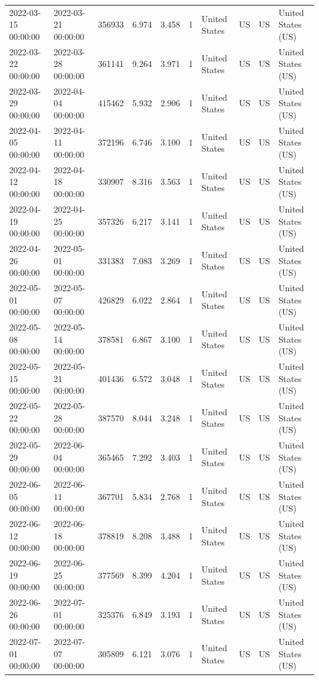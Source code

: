 \begin{tabular}{llrrrlllll}
2022-03-15 00:00:00 & 2022-03-21 00:00:00 & 356933 & 6.974 & 3.458 & 1 & United States & US & US & United States (US) \\
2022-03-22 00:00:00 & 2022-03-28 00:00:00 & 361141 & 9.264 & 3.971 & 1 & United States & US & US & United States (US) \\
2022-03-29 00:00:00 & 2022-04-04 00:00:00 & 415462 & 5.932 & 2.906 & 1 & United States & US & US & United States (US) \\
2022-04-05 00:00:00 & 2022-04-11 00:00:00 & 372196 & 6.746 & 3.100 & 1 & United States & US & US & United States (US) \\
2022-04-12 00:00:00 & 2022-04-18 00:00:00 & 330907 & 8.316 & 3.563 & 1 & United States & US & US & United States (US) \\
2022-04-19 00:00:00 & 2022-04-25 00:00:00 & 357326 & 6.217 & 3.141 & 1 & United States & US & US & United States (US) \\
2022-04-26 00:00:00 & 2022-05-01 00:00:00 & 331383 & 7.083 & 3.269 & 1 & United States & US & US & United States (US) \\
2022-05-01 00:00:00 & 2022-05-07 00:00:00 & 426829 & 6.022 & 2.864 & 1 & United States & US & US & United States (US) \\
2022-05-08 00:00:00 & 2022-05-14 00:00:00 & 378581 & 6.867 & 3.100 & 1 & United States & US & US & United States (US) \\
2022-05-15 00:00:00 & 2022-05-21 00:00:00 & 401436 & 6.572 & 3.048 & 1 & United States & US & US & United States (US) \\
2022-05-22 00:00:00 & 2022-05-28 00:00:00 & 387570 & 8.044 & 3.248 & 1 & United States & US & US & United States (US) \\
2022-05-29 00:00:00 & 2022-06-04 00:00:00 & 365465 & 7.292 & 3.403 & 1 & United States & US & US & United States (US) \\
2022-06-05 00:00:00 & 2022-06-11 00:00:00 & 367701 & 5.834 & 2.768 & 1 & United States & US & US & United States (US) \\
2022-06-12 00:00:00 & 2022-06-18 00:00:00 & 378819 & 8.208 & 3.488 & 1 & United States & US & US & United States (US) \\
2022-06-19 00:00:00 & 2022-06-25 00:00:00 & 377569 & 8.399 & 4.204 & 1 & United States & US & US & United States (US) \\
2022-06-26 00:00:00 & 2022-07-01 00:00:00 & 325376 & 6.849 & 3.193 & 1 & United States & US & US & United States (US) \\
2022-07-01 00:00:00 & 2022-07-07 00:00:00 & 305809 & 6.121 & 3.076 & 1 & United States & US & US & United States (US) \\

\end{tabular}
